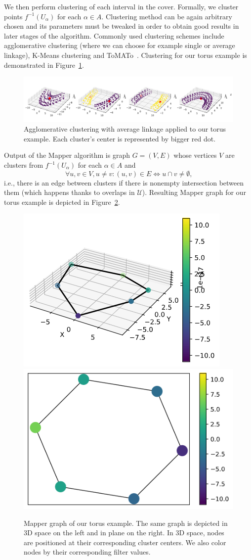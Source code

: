 \documentclass{article}
\begin{document}
We then perform clustering of each interval in the cover. Formally, we cluster
points $f^{-1}(U_\alpha)$ for each $\alpha \in A$. Clustering method can be
again arbitrary chosen and its parameters must be tweaked in order to obtain
good results in later stages of the algorithm. Commonly used clustering schemes
include agglomerative clustering (where we can choose for example single or
average linkage), K\nobreakdash-Means clustering and ToMATo~\cite{tomato}. Clustering for our
torus example is demonstrated in Figure~\ref{fig:torus-cluster}.

\begin{figure}[H]
    \centering
    \includegraphics[width=0.9\columnwidth]{torus-clustering}
    \caption{Agglomerative clustering with average linkage applied to our torus example.
        Each cluster's center is represented by bigger red dot.}
    \label{fig:torus-cluster}
\end{figure}

Output of the Mapper algorithm is graph $G=(V,E)$ whose vertices $V$ are
clusters from $f^{-1}(U_\alpha)$ for each $\alpha \in A$ and
$$
    \forall u, v \in V, u \neq v: (u, v) \in E \Leftrightarrow u \cap v \neq \emptyset \mbox{,}
$$
i.e., there is an edge between clusters if there is nonempty intersection between them (which happens thanks to overlaps in $\mathcal{U}$).
Resulting Mapper graph for our torus example is depicted in Figure~\ref{fig:torus-mapper}.

\begin{figure}[ht]
    \centering
    \includegraphics[align=c, width=0.4\columnwidth]{torus-graph-3d}
    \includegraphics[align=c, width=0.4\columnwidth]{torus-graph-2d}
    \caption{Mapper graph of our torus example.
        The same graph is depicted in 3D space on the left and in plane on the right.
        In 3D space, nodes are positioned at their corresponding cluster centers.
        We also color nodes by their corresponding filter values.}
    \label{fig:torus-mapper}
\end{figure}
\end{document}

